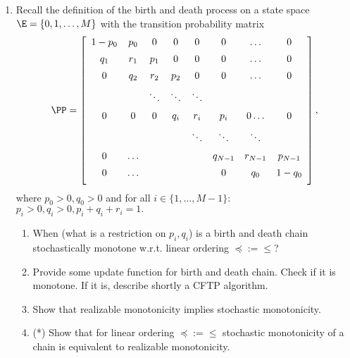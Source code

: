 \documentclass[a4paper,12pt]{article}
\begin{document}
\medskip\par 
\begin{enumerate}
\item

 Recall the definition of the birth and death process on a state space $\E=\{0,1,\ldots,M\}$ with the transition probability matrix
$$\PP=\left[
\begin{array}{ccccccccc}
1-p_0 & p_0 & 0 & 0 & 0  & 0 &\ldots & 0 \\[5pt]
q_1 & r_1 & p_1 & 0 & 0 & 0 &\ldots & 0 \\[5pt]
0 & q_2 & r_2 & p_2 & 0 & 0 &\ldots & 0\\[5pt]
  &      & \ddots& \ddots& \ddots\\[5pt]
0 & 0 & 0 & q_i & r_i & p_i &0 \ldots &0 \\[5pt]
 &  & &      & \ddots& \ddots& \ddots\\[5pt]
 0&\ldots &  & &      & q_{N-1} & r_{N-1} & p_{N-1} \\[5pt]
 0&\ldots &  & &      & 0 & q_0 & 1-q_0 \\[5pt]
    \end{array}\right],$$
    where $p_0>0, q_0>0$ and for all $i\in\{1,\ldots,M-1\}$: $p_i>0, q_i>0, p_i+q_i+r_i=1.$ 
    
\begin{enumerate}
 \item When (what is a restriction on $p_i,q_i$) is a birth and death chain   stochastically monotone w.r.t. linear 
 ordering $\preceq:=\leq$?
 
 \item Provide some update function for birth and death chain. Check if it is monotone.
 If it is, describe shortly a CFTP algorithm.
 
 \item Show that realizable monotonicity implies stochastic monotonicity.
 
 \item (*) Show that for linear ordering $\preceq:=\leq$ stochastic monotonicity 
 of a chain is equivalent to realizable monotonicity.
 
 
     
\end{enumerate}



\end{enumerate}
\end{document}
